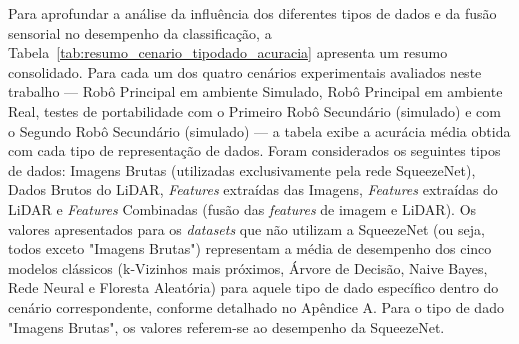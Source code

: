 Para aprofundar a análise da influência dos diferentes tipos de dados e da fusão sensorial no desempenho da classificação, a Tabela~\ref{tab:resumo_cenario_tipodado_acuracia} apresenta um resumo consolidado. Para cada um dos quatro cenários experimentais avaliados neste trabalho — Robô Principal em ambiente Simulado, Robô Principal em ambiente Real, testes de portabilidade com o Primeiro Robô Secundário (simulado) e com o Segundo Robô Secundário (simulado) — a tabela exibe a acurácia média obtida com cada tipo de representação de dados. Foram considerados os seguintes tipos de dados: Imagens Brutas (utilizadas exclusivamente pela rede SqueezeNet), Dados Brutos do LiDAR, \textit{Features} extraídas das Imagens, \textit{Features} extraídas do LiDAR e \textit{Features} Combinadas (fusão das \textit{features} de imagem e LiDAR). Os valores apresentados para os \textit{datasets} que não utilizam a SqueezeNet (ou seja, todos exceto "Imagens Brutas") representam a média de desempenho dos cinco modelos clássicos (k-Vizinhos mais próximos, Árvore de Decisão, Naive Bayes, Rede Neural e Floresta Aleatória) para aquele tipo de dado específico dentro do cenário correspondente, conforme detalhado no Apêndice A. Para o tipo de dado "Imagens Brutas", os valores referem-se ao desempenho da SqueezeNet.

